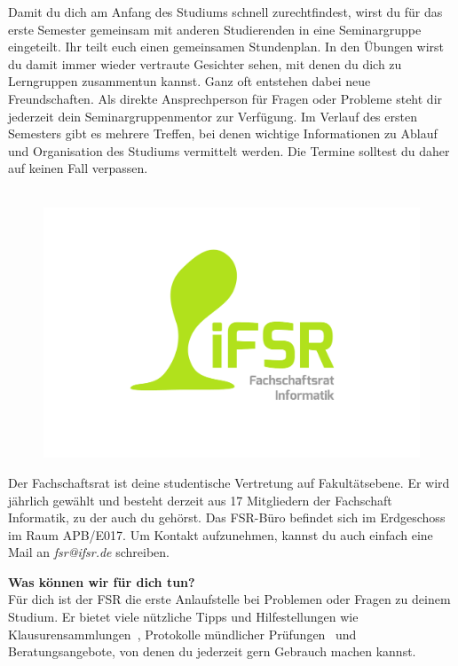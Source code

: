 \pagebreak

\label{sec:seminargruppen}
Damit du dich am Anfang des Studiums schnell zurechtfindest, wirst du für das erste Semester gemeinsam mit anderen Studierenden in eine Seminargruppe eingeteilt.
Ihr teilt euch einen gemeinsamen Stundenplan.
In den Übungen wirst du damit immer wieder vertraute Gesichter sehen, mit denen du dich zu Lerngruppen zusammentun kannst.
Ganz oft entstehen dabei neue Freundschaften.
Als direkte Ansprechperson für Fragen oder Probleme steht dir jederzeit dein Seminargruppenmentor zur Verfügung.
Im Verlauf des ersten Semesters gibt es mehrere Treffen, bei denen wichtige Informationen zu Ablauf und Organisation des Studiums vermittelt werden. Die Termine solltest du daher auf keinen Fall verpassen.


\label{sec:fachschaftsrat}
\begin{figure}\ \\[-1cm]
\flushright\includegraphics[width=\linewidth, trim=160 150 150 50, clip]{img/fsr_logo}
\end{figure}

Der Fachschaftsrat ist deine studentische Vertretung auf Fakultätsebene.
Er wird jährlich gewählt und besteht derzeit aus 17 Mitgliedern der Fachschaft Informatik, zu der auch du gehörst.
Das FSR-Büro befindet sich im Erdgeschoss im Raum APB/E017.
Um Kontakt aufzunehmen, kannst du auch einfach eine Mail an \textit{fsr@ifsr.de} schreiben.

\textbf{Was können wir für dich tun?} \\
Für dich ist der FSR die erste Anlaufstelle bei Problemen oder Fragen zu deinem Studium. Er bietet viele nützliche Tipps und Hilfestellungen wie Klausurensammlungen~, Protokolle mündlicher Prüfungen~ und Beratungsangebote, von denen du jederzeit gern Gebrauch machen kannst.

